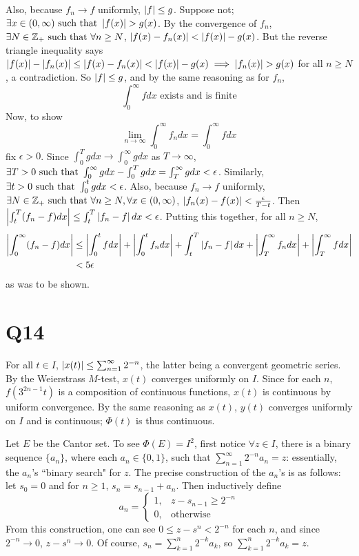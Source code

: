 \documentclass[12pt]{article}
\begin{document}
Also, because $f_n \rightarrow f$ uniformly, $\left|f\right| \leq g$. 
Suppose not; $\exists x \in (0, \infty) \text{ such that } \left|f(x)\right| > g(x)$. 
By the convergence of $f_n$, $\exists N \in \mathbb{Z}_{+} \text{ such that } \forall n \geq N$, $\left|f(x) - f_n(x)\right| < \left|f(x)\right| - g(x)$.
But the reverse triangle inequality says $\left|f(x)\right| - \left|f_n(x)\right| \leq \left|f(x) - f_n(x)\right| < \left|f(x)\right| - g(x) \implies \left|f_n(x)\right| > g(x)$ for all $n \geq N$, a contradiction.
So $\left|f\right| \leq g$, and by the same reasoning as for $f_n$, 
$$\int_{0}^{\infty} f dx \text{ exists and is finite}$$
Now, to show
$$\lim_{n \rightarrow \infty} \int_{0}^{\infty} f_n dx = \int_{0}^{\infty} f dx$$ 
fix $\epsilon > 0$. 
Since $\int_{0}^{T} gdx \rightarrow \int_{0}^{\infty} g dx$ as $T \rightarrow \infty$, $\exists T > 0 \text{ such that } \int_{0}^{\infty} g dx - \int_{0}^{T} g dx =  \int_{T}^{\infty} g dx < \epsilon$. 
Similarly, $\exists t > 0 \text{ such that } \int_{0}^{t} g dx < \epsilon$. 
Also, because $f_n \rightarrow f$ uniformly, $\exists N \in \mathbb{Z}_{+} \text{ such that } \forall n \geq N, \forall x \in (0, \infty)$, $\left|f_n(x) - f(x)\right| < \frac{\epsilon}{T - t}$. 
Then $\left|\int_{t}^{T} (f_n - f)dx\right| \leq \int_{t}^{T} \left|f_n - f\right| dx < \epsilon$.
Putting this together, for all $n \geq N$,  
\begin{align*} 
  \left|\int_{0}^{\infty} (f_n - f) dx\right| & \leq \left|\int_{0}^{t} f dx\right| + \left|\int_{0}^{t} f_n dx\right| + \int_{t}^{T} \left|f_n - f\right| dx + \left|\int_{T}^{\infty} f_n dx\right| + \left|\int_{T}^{\infty} f dx\right| \\ 
                                       & < 5 \epsilon 
\end{align*} 
as was to be shown. 

\section*{Q14} 
\setcounter{equation}{0}
For all $t \in I$, $\left|x(t)\right| \leq \sum_{n = 1}^{\infty} 2^{-n}$, the latter being a convergent geometric series. 
By the Weierstrass $M$-test, $x(t)$ converges uniformly on $I$. 
Since for each $n$, $f(3^{2n - 1} t)$ is a composition of continuous functions, $x(t)$ is continuous by uniform convergence. 
By the same reasoning as $x(t)$, $y(t)$ converges uniformly on $I$ and is continuous;
$\varPhi(t)$ is thus continuous. 

Let $E$ be the Cantor set.
To see $\varPhi(E) = I^2$, first notice $\forall z \in I$, there is a binary sequence $\{a_n\}$, where each $a_n \in \{0, 1\}$, such that $\sum_{n = 1}^{\infty} 2^{-n} a_n = z$: 
essentially, the $a_n$'s ``binary search" for $z$. 
The precise construction of the $a_n$'s is as follows: let $s_0 = 0$ and for $n \geq 1$, $s_n = s_{n - 1} + a_n$.
Then inductively define 
$$a_n = \begin{cases}
  1, & z - s_{n - 1} \geq 2^{-n} \\ 
  0, & \text{otherwise} \end{cases}$$
From this construction, one can see $0 \leq z - s^n < 2^{-n}$ for each $n$, and since $2^{-n} \rightarrow 0$, $z - s^n \rightarrow 0$. 
Of course, $s_n = \sum_{k = 1}^{n} 2^{-k} a_k$, so $\sum_{k = 1}^{n} 2^{-k} a_k = z$.
\end{document}
